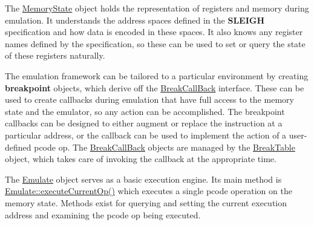 The \mbox{\hyperlink{class_memory_state}{Memory\+State}} object holds the representation of registers and memory during emulation. It understands the address spaces defined in the {\bfseries{S\+L\+E\+I\+GH}} specification and how data is encoded in these spaces. It also knows any register names defined by the specification, so these can be used to set or query the state of these registers naturally.

The emulation framework can be tailored to a particular environment by creating {\bfseries{breakpoint}} objects, which derive off the \mbox{\hyperlink{class_break_call_back}{Break\+Call\+Back}} interface. These can be used to create callbacks during emulation that have full access to the memory state and the emulator, so any action can be accomplished. The breakpoint callbacks can be designed to either augment or replace the instruction at a particular address, or the callback can be used to implement the action of a user-\/defined pcode op. The \mbox{\hyperlink{class_break_call_back}{Break\+Call\+Back}} objects are managed by the \mbox{\hyperlink{class_break_table}{Break\+Table}} object, which takes care of invoking the callback at the appropriate time.

The \mbox{\hyperlink{class_emulate}{Emulate}} object serves as a basic execution engine. Its main method is \mbox{\hyperlink{class_emulate_aad37ba97a90d7cd5338a75afce3a21b9}{Emulate\+::execute\+Current\+Op()}} which executes a single pcode operation on the memory state. Methods exist for querying and setting the current execution address and examining the pcode op being executed.

